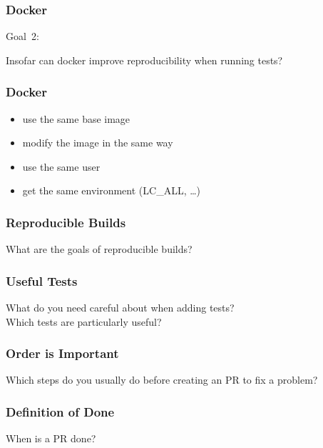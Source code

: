 
\begin{frame}
	\frametitle{Docker}

	Goal~2:
	\begin{task}
	Insofar can docker improve reproducibility when running tests?
	\end{task}
\end{frame}

\begin{frame}
	\frametitle{Docker}

	\begin{itemize} %
	\item use the same base image
	\item modify the image in the same way
	\item use the same user
	\item get the same environment (LC\_ALL, \dots)
	\end{itemize}
\end{frame}

\breakframe

\begin{frame}
	\frametitle{Reproducible Builds}

	\begin{task}
	What are the goals of reproducible builds?
	\end{task}
\end{frame}


\begin{frame}
	\frametitle{Useful Tests}

	\begin{task}
	What do you need careful about when adding tests? \\
	Which tests are particularly useful?
	\end{task}
\end{frame}


\begin{frame}
	\frametitle{Order is Important}

	\begin{task}
	Which steps do you usually do before creating an PR to fix a problem?
	\end{task}
\end{frame}


\begin{frame}
	\frametitle{Definition of Done}

	\begin{task}
	When is a PR done?
	\end{task}
\end{frame}

